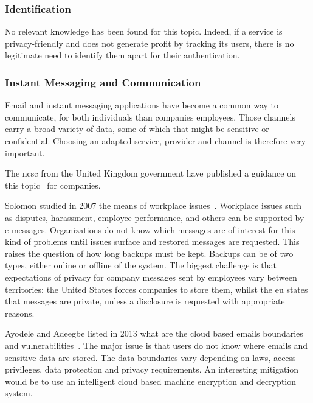 \subsubsection{Identification}
\label{subsubsec:state_review_results_identification}

No relevant knowledge has been found for this topic. Indeed, if a service is privacy-friendly and does not generate profit by tracking its users, there is no legitimate need to identify them apart for their authentication.

\subsubsection{Instant Messaging and Communication}
\label{subsubsec:state_review_results_imcommunication}

Email and instant messaging applications have become a common way to communicate, for both individuals than companies employees. Those channels carry a broad variety of data, some of which that might be sensitive or confidential. Choosing an adapted service, provider and channel is therefore very important.

The \gls{ncsc} from the United Kingdom government have published a guidance on this topic~\cite{ncsc_2020} for companies.

Solomon studied in 2007 the means of workplace issues~\cite{solomon_balancing_2007}. Workplace issues such as disputes, harassment, employee performance, and others can be supported by e-messages. Organizations do not know which messages are of interest for this kind of problems until issues surface and restored messages are requested. This raises the question of how long backups must be kept. Backups can be of two types, either online or offline of the system. The biggest challenge is that expectations of privacy for company messages sent by employees vary between territories: the United States forces companies to store them, whilst the \gls{eu} states that messages are private, unless a disclosure is requested with appropriate reasons. %

Ayodele and Adeegbe listed in 2013 what are the \Gls{cloud} based emails boundaries and vulnerabilities~\cite{ayodele_cloud_2013}. The major issue is that users do not know where emails and sensitive data are stored. The data boundaries vary depending on laws, access privileges, data protection and privacy requirements. An interesting mitigation would be to use an intelligent \gls{cloud} based machine encryption and decryption system. %

